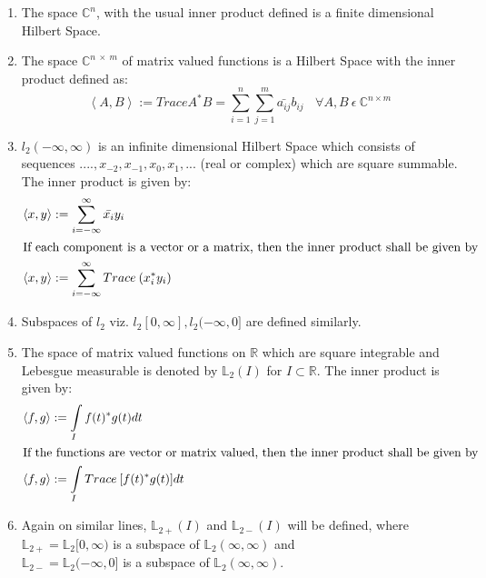 \documentclass[a4paper,12pt]{article}
\begin{document}
			\begin{enumerate}
				\item The space $\mathbb{C}^{n}$, with the usual inner product defined is a finite dimensional Hilbert Space.
				\item The space $\mathbb{C}^{n\:\times\:m}$ of matrix valued functions is a Hilbert Space with the inner product defined as:
					\begin{equation}
						\left\langle A, B \right\rangle := Trace A^{*}B = \sum\limits_{i=1}^n \sum\limits_{j=1}^m \bar{a_{ij}}b_{ij} \:\:\:\: \forall A,B \:\epsilon \:\mathbb{C}^{n \times m}
					\end{equation}
				\item $l_{2}(-\infty,\infty)$ is an infinite dimensional Hilbert Space which consists of sequences ${....,x_{-2},x_{-1},x_{0},x_{1},...}$ (real or complex) which are square summable. The inner product is given by:
					\begin{align*}
						\left\langle x, y \right\rangle &:= \sum\limits_{i=-\infty}^\infty \bar{x_{i}}y_{i}\\
						\intertext{If each component is a vector or a matrix, then the inner product shall be given by}
						\left\langle x, y \right\rangle &:= \sum\limits_{i=-\infty}^\infty Trace \: (x_{i}^{*}y_{i})\\						
					\end{align*}
				\item Subspaces of $l_{2}$ viz. $l_{2}[0,\infty],l_{2}(-\infty,0]$ are defined similarly.
				\item The space of matrix valued functions on $\mathbb{R}$ which are square integrable and Lebesgue measurable is denoted by $\mathbb{L}_{2}(I)$ for $I \subset \mathbb{R}$. The inner product is given by:
				\begin{align*}
						\left\langle f, g \right\rangle &:= \int\limits_{I}f(t)^*g(t)dt\\
						\intertext{If the functions are vector or matrix valued, then the inner product shall be given by}
						\left\langle f, g \right\rangle &:= \int\limits_{I} Trace \: [f(t)^{*}g(t)]dt\\						
					\end{align*}
				\item Again on similar lines, $\mathbb{L}_{2+}(I)$ and $\mathbb{L}_{2-}(I)$ will be defined, where\\ $\mathbb{L}_{2+} = \mathbb{L}_{2}[0,\infty)$ is a subspace of $\mathbb{L}_{2}(\infty,\infty)$ and \\
		$\mathbb{L}_{2-} = \mathbb{L}_{2}(-\infty,0]$ is a subspace of $\mathbb{L}_{2}(\infty,\infty)$.
		
			\end{enumerate}
\end{document}
